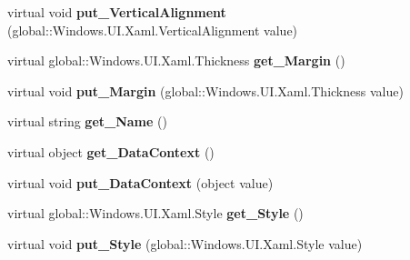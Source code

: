 \begin{DoxyCompactItemize}
\item 
\mbox{\label{class_windows_1_1_u_i_1_1_xaml_1_1_framework_element_aba9ea4c55cf725923ab5b187ab461767}} 
virtual void {\bfseries put\+\_\+\+Vertical\+Alignment} (global\+::\+Windows.\+U\+I.\+Xaml.\+Vertical\+Alignment value)
\item 
\mbox{\label{class_windows_1_1_u_i_1_1_xaml_1_1_framework_element_acd5d4f2d24189eebb96488bffcf0e52e}} 
virtual global\+::\+Windows.\+U\+I.\+Xaml.\+Thickness {\bfseries get\+\_\+\+Margin} ()
\item 
\mbox{\label{class_windows_1_1_u_i_1_1_xaml_1_1_framework_element_a530e383a49fbab5e2b808a8709af8cef}} 
virtual void {\bfseries put\+\_\+\+Margin} (global\+::\+Windows.\+U\+I.\+Xaml.\+Thickness value)
\item 
\mbox{\label{class_windows_1_1_u_i_1_1_xaml_1_1_framework_element_af75a0b9279cd88b148a7a58c3ee46d75}} 
virtual string {\bfseries get\+\_\+\+Name} ()
\item 
\mbox{\label{class_windows_1_1_u_i_1_1_xaml_1_1_framework_element_ad0581fd837683c9421c10618e8889baa}} 
virtual object {\bfseries get\+\_\+\+Data\+Context} ()
\item 
\mbox{\label{class_windows_1_1_u_i_1_1_xaml_1_1_framework_element_a16dcfc1dee5715c7ad1fcf1583da3c52}} 
virtual void {\bfseries put\+\_\+\+Data\+Context} (object value)
\item 
\mbox{\label{class_windows_1_1_u_i_1_1_xaml_1_1_framework_element_a3480ff37b1b5a51609195d9f75bc85af}} 
virtual global\+::\+Windows.\+U\+I.\+Xaml.\+Style {\bfseries get\+\_\+\+Style} ()
\item 
\mbox{\label{class_windows_1_1_u_i_1_1_xaml_1_1_framework_element_a7d0ee354514743a6657ebcd74e705b0a}} 
virtual void {\bfseries put\+\_\+\+Style} (global\+::\+Windows.\+U\+I.\+Xaml.\+Style value)

\end{DoxyCompactItemize}
